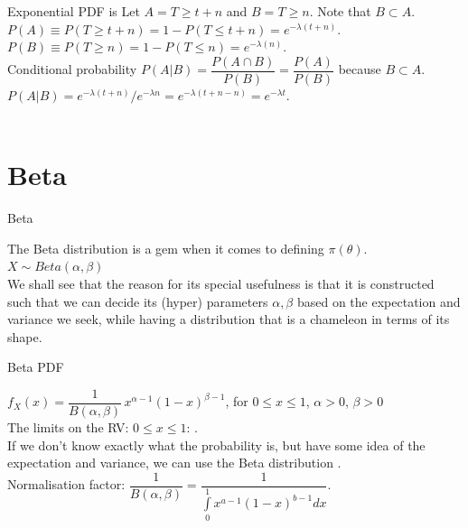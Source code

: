 \documentclass[10pt,sans,english,compress,xcolor=dvipsnames]{beamer}
\begin{document}
\begin{frame}[fragile]{Exponential PDF is }
\small
Let $A = T\geq  t+n $ and $B = T \geq n$. Note that $B\subset A$.\\[2ex]
$P(A) \equiv P(T \geq t+n) = 1-P(T \leq t+n) = e^{-\lambda(t+n)}$.\\[2ex]
$P(B) \equiv P(T \geq n) = 1-P(T \leq n) = e^{-\lambda(n)}$.\\[2ex]
Conditional probability $P(A|B) = \dfrac{P(A\cap B)}{P(B)} = \dfrac{P(A)}{P(B)}$  because $B\subset A$.\\[3ex]
$P(A|B)  = e^{-\lambda(t+n)} / e^{-\lambda n} = e^{-\lambda(t+n-n)} = e^{-\lambda t}. $\\[3ex]
\\[2ex]

\end{frame}


\section{Beta}

\begin{frame}{Beta}

The Beta distribution is a gem when it comes to defining  $\pi(\theta)$.\\[1ex]

$X \sim Beta(\alpha,\beta)$\\[2ex]

We shall see that the reason for its special usefulness is that it is constructed such that we can decide its (hyper) parameters $\alpha, \beta$ based on the expectation and variance we seek, while having a distribution that is a chameleon in terms of its shape.\\[1ex]

\end{frame} 


\begin{frame}{Beta PDF}

\small

$f_X(x) = \dfrac{1}{B(\alpha,\beta)}\, x^{\alpha-1} (1-x)^{\beta-1}$, for $0\leq x \leq 1$, $\alpha>0$, $\beta>0$\\[1ex]

The limits on the RV: $0\leq x \leq 1$: .\\[1ex]

If we don't know exactly what the probability is, but have some idea of the expectation and variance, we can use the Beta distribution .\\[1ex]

Normalisation factor:  $\dfrac{1}{B(\alpha,\beta)} = \dfrac{1}{ \int\limits_0^1 x^{a-1} (1-x)^{b-1} dx}$.\\[1ex]

\end{frame} 
\end{document}
